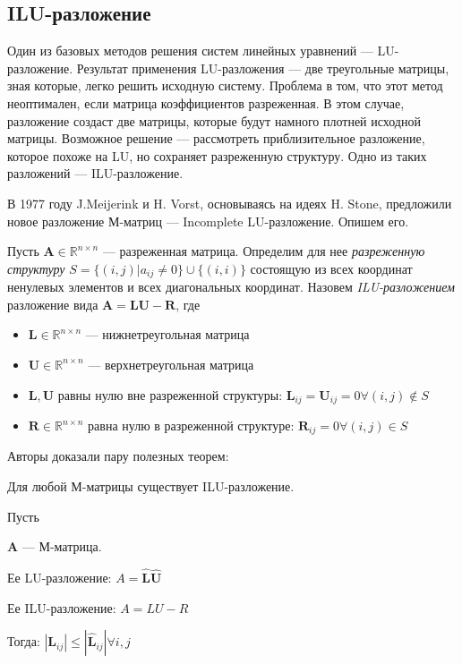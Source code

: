 \documentclass[14pt, a4paper]{extreport}
\begin{document}
\clearpage
\subsection{ILU-разложение}
Один из базовых методов решения систем линейных уравнений --- LU-разложение. Результат применения LU-разложения --- две треугольные матрицы, зная которые, легко решить исходную систему. Проблема в том, что этот метод неоптимален, если матрица коэффициентов разреженная. В этом случае, разложение создаст две матрицы, которые будут намного плотней исходной матрицы. Возможное решение --- рассмотреть приблизительное разложение, которое похоже на LU, но сохраняет разреженную структуру. Одно из таких разложений --- ILU-разложение.

В 1977 году J.Meijerink и H. Vorst, основываясь на идеях H. Stone\cite{proto_ilu}, предложили новое разложение М-матриц --- Incomplete LU-разложение\cite{ilu}. Опишем его.

Пусть $\mathbf{A} \in \mathbb{R}^{n \times n}$ --- разреженная матрица. Определим для нее \emph{разреженную структуру} $S = \{(i, j) | a_{ij} \neq 0\} \cup \{(i,i)\}$ состоящую из всех координат ненулевых элементов и всех диагональных координат. Назовем \emph{ILU-разложением} разложение вида $\mathbf{A} = \mathbf{L}\mathbf{U} - \mathbf{R}$, где
\begin{itemize}
	\item $\mathbf{L} \in \mathbb{R}^{n \times n}$ --- нижнетреугольная матрица
	\item $\mathbf{U} \in \mathbb{R}^{n \times n}$ --- верхнетреугольная матрица
	\item $\mathbf{L}, \mathbf{U}$ равны нулю вне разреженной структуры: $\mathbf{L}_{ij} = \mathbf{U}_{ij} = 0 \forall (i, j) \notin S$
	\item $\mathbf{R} \in \mathbb{R}^{n \times n}$ равна нулю в разреженной структуре: $\mathbf{R}_{ij} = 0 \forall (i, j) \in S$
\end{itemize}

Авторы доказали пару полезных теорем:
\begin{theorem}[Существование]
	Для любой М-матрицы существует ILU-разложение.
\end{theorem}
\begin{theorem}[Устойчивость]
	Пусть 
	
	$\mathbf{A}$ --- М-матрица. 
	
	Ее LU-разложение: $A = \hat{\mathbf{L}}\hat{\mathbf{U}}$ 
	
	Ее ILU-разложение: $A = LU - R$
	
	Тогда: $|\mathbf{L}_{ij}| \leq |\hat{\mathbf{L}}_{ij}| \forall i,j$
\end{theorem}
\end{document}
